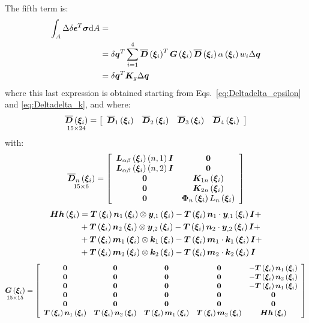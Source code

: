 The fifth term is:
\begin{equation}
\begin{split}
\int_A \Delta \delta { \T{\epsilon} }^T \T{\sigma} \text{d}A & = \\
& = \delta{\T{q}}^T  \sum_{i=1}^{4} \overline{\T{D}}\valxii^T  \T{G}\valxii  \overline{\T{D}}\valxii  \alpha \valxii  w_i \Delta \T{q} \\
& = \delta{\T{q}}^T  \T{K}_g  \Delta \T{q}
\end{split}
\end{equation}
where this last expression is obtained starting from Eqs.~\ref{eq:Deltadelta_epsilon} and \ref{eq:Deltadelta_k}, and where:
\begin{equation}
\underset{ 15 \times 24 }{\overline{\T{D}} \valxii} =
\sqbr{ \matr{ c c c c  }{
\overline{\T{D}}_1 \valxii & \overline{\T{D}}_2 \valxii & \overline{\T{D}}_3 \valxii & \overline{\T{D}}_4 \valxii
}}
\end{equation}
with:
\begin{equation}
\underset{ 15 \times 6 }{\overline{\T{D}}_n \valxii} =
\sqbr{ \matr{ c c  }{
\T{L}_{\alpha \beta} \valxii \plbr{n,1} \T{I} & \T{0} \\
\T{L}_{\alpha \beta} \valxii \plbr{n,2} \T{I} & \T{0} \\
\T{0} & \T{K}_{1n} \valxii\\
\T{0} & \T{K}_{2n} \valxii \\
\T{0} & \T{\Phi}_{n} \valxii L_{n} \valxii \\
}}
\end{equation}
\begin{equation}
\begin{split}
\T{Hh} \valxii & =
\T{T} \valxii \T{n}_1 \valxii \otimes \T{y}_{,1} \valxii - \T{T} \valxii \T{n}_1 \cdot \T{y}_{,1} \valxii \T{I} + \\
& + \T{T} \valxii \T{n}_2 \valxii \otimes \T{y}_{,2} \valxii - \T{T} \valxii \T{n}_2 \cdot \T{y}_{,2} \valxii \T{I} + \\
& + \T{T} \valxii \T{m}_1 \valxii \otimes \T{k}_{1} \valxii - \T{T} \valxii \T{m}_1 \cdot \T{k}_{1} \valxii \T{I} + \\
& + \T{T} \valxii \T{m}_2 \valxii \otimes \T{k}_{2} \valxii - \T{T} \valxii \T{m}_2 \cdot \T{k}_{2} \valxii \T{I}
\end{split}
\end{equation}
\begin{equation}
\underset{ 15 \times 15 }{ \T{G} \valxii } =
\sqbr{ \matr{ c c c c c}{
\T{0} & \T{0} & \T{0} & \T{0} & -\T{T} \valxii \T{n}_1 \valxii \\
\T{0} & \T{0} & \T{0} & \T{0} & -\T{T} \valxii \T{n}_2 \valxii \\
\T{0} & \T{0} & \T{0} & \T{0} & -\T{T} \valxii \T{n}_1 \valxii \\
\T{0} & \T{0} & \T{0} & \T{0} &  \T{0} \\
\T{0} & \T{0} & \T{0} & \T{0} &  \T{0} \\
\T{T} \valxii \T{n}_1 \valxii & \T{T} \valxii \T{n}_2 \valxii & \T{T} \valxii \T{m}_1 \valxii &  \T{T} \valxii \T{m}_2 \valxii & \T{Hh} \valxii
}}
\end{equation}
